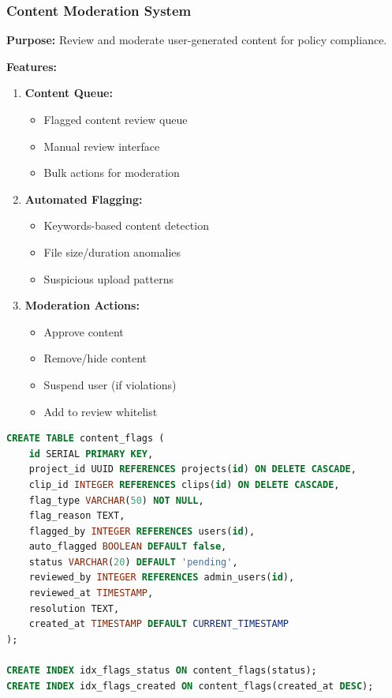 \subsubsection{Content Moderation System}

\textbf{Purpose:} Review and moderate user-generated content for policy compliance.

\textbf{Features:}

\begin{enumerate}
    \item \textbf{Content Queue:}
    \begin{itemize}
        \item Flagged content review queue
        \item Manual review interface
        \item Bulk actions for moderation
    \end{itemize}
    
    \item \textbf{Automated Flagging:}
    \begin{itemize}
        \item Keywords-based content detection
        \item File size/duration anomalies
        \item Suspicious upload patterns
    \end{itemize}
    
    \item \textbf{Moderation Actions:}
    \begin{itemize}
        \item Approve content
        \item Remove/hide content
        \item Suspend user (if violations)
        \item Add to review whitelist
    \end{itemize}
\end{enumerate}

\begin{lstlisting}[language=SQL, caption=Content Moderation Schema]
CREATE TABLE content_flags (
    id SERIAL PRIMARY KEY,
    project_id UUID REFERENCES projects(id) ON DELETE CASCADE,
    clip_id INTEGER REFERENCES clips(id) ON DELETE CASCADE,
    flag_type VARCHAR(50) NOT NULL,
    flag_reason TEXT,
    flagged_by INTEGER REFERENCES users(id),
    auto_flagged BOOLEAN DEFAULT false,
    status VARCHAR(20) DEFAULT 'pending',
    reviewed_by INTEGER REFERENCES admin_users(id),
    reviewed_at TIMESTAMP,
    resolution TEXT,
    created_at TIMESTAMP DEFAULT CURRENT_TIMESTAMP
);

CREATE INDEX idx_flags_status ON content_flags(status);
CREATE INDEX idx_flags_created ON content_flags(created_at DESC);
\end{lstlisting}

